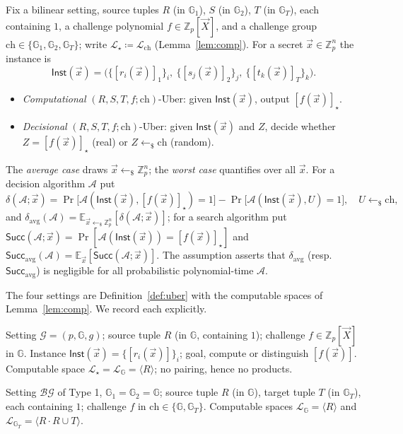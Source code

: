 \documentclass{conjura-solution}
\newcommand{\G}{\mathbb{G}}
\newcommand{\Gone}{\mathbb{G}_1}
\newcommand{\Gtwo}{\mathbb{G}_2}
\newcommand{\GT}{\mathbb{G}_T}
\newcommand{\Zp}{\mathbb{Z}_p}
\newcommand{\vx}{\vec{x}}
\newcommand{\vX}{\vec{X}}
\newcommand{\Inst}{\mathsf{Inst}}
\newcommand{\Succ}{\mathsf{Succ}}
\newcommand{\Ex}{\mathbb{E}}
\newcommand{\LL}{\mathcal{L}}
\newcommand{\Span}[1]{\langle #1 \rangle} %
\newcommand{\rsample}{\leftarrow_{\$}}
\newcommand{\bg}{\mathcal{BG}}
\newcommand{\ch}{\mathrm{ch}}
\begin{document}
\begin{definition}
\label{def:uber}
Fix a bilinear setting, source tuples $R$ (in $\Gone$), $S$ (in $\Gtwo$), $T$ (in $\GT$),
each containing $1$, a challenge polynomial $f\in\Zp[\vX]$, and a challenge group
$\ch\in\{\Gone,\Gtwo,\GT\}$; write $\LL_\star\coloneqq\LL_{\ch}$ (Lemma~\ref{lem:comp}).
For a secret $\vx\in\Zp^{n}$ the instance is
\[
  \Inst(\vx)=\bigl(\{[r_i(\vx)]_1\}_i,\ \{[s_j(\vx)]_2\}_j,\ \{[t_k(\vx)]_T\}_k\bigr).
\]
\begin{itemize}[leftmargin=1.4em,itemsep=2pt]
  \item \emph{Computational} $(R,S,T,f;\ch)$-Uber: given $\Inst(\vx)$, output
        $[f(\vx)]_\star$.
  \item \emph{Decisional} $(R,S,T,f;\ch)$-Uber: given $\Inst(\vx)$ and $Z$, decide whether
        $Z=[f(\vx)]_\star$ (real) or $Z\rsample\ch$ (random).
\end{itemize}
The \emph{average case} draws $\vx\rsample\Zp^{n}$; the \emph{worst case} quantifies over
all $\vx$. For a decision algorithm $\mathcal A$ put
\[
  \delta(\mathcal A;\vx)=\Pr\bigl[\mathcal A(\Inst(\vx),[f(\vx)]_\star)=1\bigr]
  -\Pr\bigl[\mathcal A(\Inst(\vx),U)=1\bigr],\quad U\rsample\ch,
\]
and $\delta_{\mathrm{avg}}(\mathcal A)=\Ex_{\vx\rsample\Zp^{n}}[\delta(\mathcal A;\vx)]$;
for a search algorithm put $\Succ(\mathcal A;\vx)=\Pr[\mathcal A(\Inst(\vx))=[f(\vx)]_\star]$
and $\Succ_{\mathrm{avg}}(\mathcal A)=\Ex_{\vx}[\Succ(\mathcal A;\vx)]$. The assumption
asserts that $\delta_{\mathrm{avg}}$ (resp.\ $\Succ_{\mathrm{avg}}$) is negligible for all
probabilistic polynomial-time $\mathcal A$.
\end{definition}

The four settings are Definition~\ref{def:uber} with the computable spaces of
Lemma~\ref{lem:comp}. We record each explicitly.

\begin{definition}
Setting $\mathcal G=(p,\G,g)$; source tuple $R$ (in $\G$, containing $1$); challenge
$f\in\Zp[\vX]$ in $\G$. Instance $\Inst(\vx)=\{[r_i(\vx)]\}_i$; goal, compute or distinguish
$[f(\vx)]$. Computable space $\LL_\star=\LL_{\G}=\Span{R}$; no pairing, hence no products.
\end{definition}

\begin{definition}
Setting $\bg$ of Type 1, $\Gone=\Gtwo=\G$; source tuple $R$ (in $\G$), target tuple $T$
(in $\GT$), each containing $1$; challenge $f$ in $\ch\in\{\G,\GT\}$. Computable spaces
$\LL_{\G}=\Span{R}$ and $\LL_{\GT}=\Span{R\cdot R\cup T}$.
\end{definition}
\end{document}
